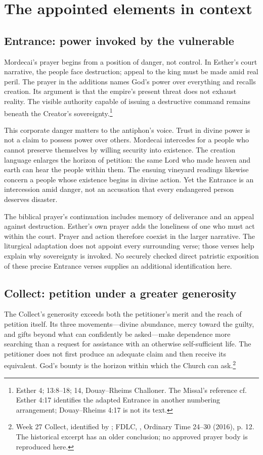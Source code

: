 \section{The appointed elements in context}
\subsection{Entrance: power invoked by the vulnerable}
Mordecai's prayer begins from a position of danger, not control. In Esther's court narrative, the people face destruction; appeal to the king must be made amid real peril. The prayer in the additions names God's power over everything and recalls creation. Its argument is that the empire's present threat does not exhaust reality. The visible authority capable of issuing a destructive command remains beneath the Creator's sovereignty.\footnote{Esther 4; 13:8--18; 14, Douay--Rheims Challoner. The Missal's reference cf. Esther 4:17 identifies the adapted Entrance in another numbering arrangement; Douay--Rheims 4:17 is not its text.}

This corporate danger matters to the antiphon's voice. Trust in divine power is not a claim to possess power over others. Mordecai intercedes for a people who cannot preserve themselves by willing security into existence. The creation language enlarges the horizon of petition: the same Lord who made heaven and earth can hear the people within them. The ensuing vineyard readings likewise concern a people whose existence begins in divine action. Yet the Entrance is an intercession amid danger, not an accusation that every endangered person deserves disaster.

The biblical prayer's continuation includes memory of deliverance and an appeal against destruction. Esther's own prayer adds the loneliness of one who must act within the court. Prayer and action therefore coexist in the larger narrative. The liturgical adaptation does not appoint every surrounding verse; those verses help explain why sovereignty is invoked. No securely checked direct patristic exposition of these precise Entrance verses supplies an additional identification here.

\subsection{Collect: petition under a greater generosity}
The Collect's generosity exceeds both the petitioner's merit and the reach of petition itself. Its three movements---divine abundance, mercy toward the guilty, and gifts beyond what can confidently be asked---make dependence more searching than a request for assistance with an otherwise self-sufficient life. The petitioner does not first produce an adequate claim and then receive its equivalent. God's bounty is the horizon within which the Church can ask.\footnote{Week 27 Collect, identified by ; FDLC, , Ordinary Time 24--30 (2016), p. 12. The historical excerpt has an older conclusion; no approved prayer body is reproduced here.}

